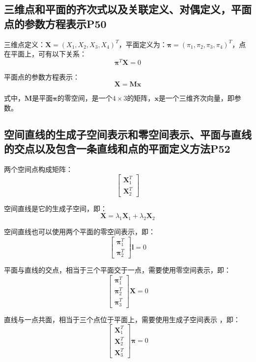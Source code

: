 \documentclass[11pt]{article}
\begin{document}
\subsection{三维点和平面的齐次式以及关联定义、对偶定义，平面点的参数方程表示P50}
三维点定义：$\mathbf{X}=(X_1,X_2,X_3,X_4)^T$，平面定义为：$\mathbold{\pi}=(\pi_1,\pi_2,\pi_3,\pi_4)^T$，点在平面上，可有以下关系：
\begin{equation*}
  \mathbold{\pi}^T\mathbf{X}=0
\end{equation*}\par
平面点的参数方程表示：
\begin{equation*}
  \mathbf{X}=\mathbf{Mx}
\end{equation*}\par
式中，$\mathbf{M}$是平面$\mathbold{\pi}$的零空间，是一个$4\times3$的矩阵，$\mathbf{x}$是一个三维齐次向量，即参数。
\subsection{	空间直线的生成子空间表示和零空间表示、平面与直线的交点以及包含一条直线和点的平面定义方法P52}
两个空间点构成矩阵：
\begin{equation*}
  \begin{bmatrix}
    \mathbf{X}_1^T \\
     \mathbf{X}_2^T
  \end{bmatrix} 
\end{equation*}\par
空间直线是它的生成子空间，即：
\begin{equation*}
  \mathbf{X}=\lambda_1\mathbf{X}_1+\lambda_2\mathbf{X}_2
\end{equation*}\par
空间直线也可以使用两个平面的零空间表示，即：
\begin{equation*}
  \begin{bmatrix}
    \mathbold{\pi}_1^T \\
     \mathbold{\pi}_2^T
  \end{bmatrix} \mathbf{l}=0
\end{equation*}\par
平面与直线的交点，相当于三个平面交于一点，需要使用零空间表示，即：
\begin{equation*}
  \begin{bmatrix}
    \mathbold{\pi}_1^T \\
    \mathbold{\pi}_2^T\\
    \mathbold{\pi}_3^T
  \end{bmatrix} \mathbf{X}=0
\end{equation*}\par
直线与一点共面，相当于三个点位于平面上，需要使用生成子空间表示 ，即：
\begin{equation*}
  \begin{bmatrix}
    \mathbf{X}_1^T \\
    \mathbf{X}_2^T\\
    \mathbf{X}_3^T
  \end{bmatrix} \mathbold{\pi}=0
\end{equation*}\par
\end{document}
